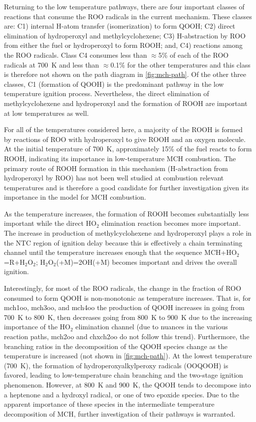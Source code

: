 \documentclass[../main.tex]{subfiles}
\begin{document}
Returning to the low temperature pathways, there are four important classes of
reactions that consume the ROO radicals in the current mechanism. These classes
are: C1) internal H-atom transfer (isomerization) to form QOOH; C2) direct
elimination of hydroperoxyl and methylcyclohexene; C3) H-abstraction by ROO
from either the fuel or hydroperoxyl to form ROOH; and, C4) reactions among the
ROO radicals. Class C4 consumes less than $\approx$5\% of each of the ROO radicals at
\SI{700}{\kelvin} and less than $\approx$0.1\% for the other temperatures and this class is
therefore not shown on the path diagram in \cref{fig:mch-path}. Of the other
three classes, C1 (formation of QOOH) is the predominant pathway in the low
temperature ignition process. Nevertheless, the direct elimination of
methylcyclohexene and hydroperoxyl and the formation of ROOH are important at
low temperatures as well.

For all of the temperatures considered here, a majority of the ROOH is formed
by reactions of ROO with hydroperoxyl to give ROOH and an oxygen molecule. At
the initial temperature of \SI{700}{\kelvin}, approximately 15\% of the fuel reacts to form
ROOH, indicating its importance in low-temperature MCH combustion. The primary
route of ROOH formation in this mechanism (H-abstraction from hydroperoxyl by
ROO) has not been well studied at combustion relevant temperatures
\cite{Zador2011} and is therefore a good candidate for further investigation
given its importance in the model for MCH combustion.

As the temperature increases, the formation of ROOH becomes substantially less
important while the direct HO$_2$ elimination reaction becomes more important.
The increase in production of methylcyclohexene and hydroperoxyl plays a role
in the NTC region of ignition delay because this is effectively a chain
terminating channel until the temperature increases enough that the sequence
MCH+HO$_2$=R+H$_2$O$_2$; H$_2$O$_2$(+M)=2OH(+M) becomes important and drives
the overall ignition.

Interestingly, for most of the ROO radicals, the change in the fraction of ROO
consumed to form QOOH is non-monotonic as temperature increases. That is, for
mch1oo, mch3oo, and mch4oo the production of QOOH increases in going from \SI{700}{\kelvin}
to \SI{800}{\kelvin}, then decreases going from \SI{800}{\kelvin} to \SI{900}{\kelvin} due to the increasing
importance of the HO$_2$ elimination channel (due to nuances in the various
reaction paths, mch2oo and chxch2oo do not follow this trend). Furthermore,
the branching ratios in the decomposition of the QOOH species change as the
temperature is increased (not shown in \cref{fig:mch-path}). At the lowest
temperature (\SI{700}{\kelvin}), the formation of hydroperoxyalkylperoxy radicals (OOQOOH)
is favored, leading to low-temperature chain branching and the two-stage
ignition phenomenon. However, at \SI{800}{\kelvin} and \SI{900}{\kelvin}, the QOOH tends to decompose
into a heptenone and a hydroxyl radical, or one of two epoxide species. Due to
the apparent importance of these species in the intermediate temperature
decomposition of MCH, further investigation of their pathways is warranted.
\end{document}
